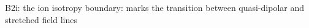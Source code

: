 
 B2i: the ion isotropy boundary: marks the transition between
 quasi-dipolar and stretched field lines
